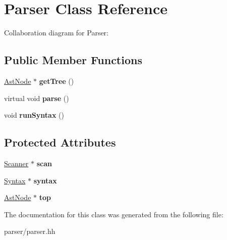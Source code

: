 \hypertarget{classParser}{}\section{Parser Class Reference}
\label{classParser}


Collaboration diagram for Parser\+:
\subsection*{Public Member Functions}
\begin{DoxyCompactItemize}
\item 
\mbox{\label{classParser_a2edc94ad5518bf2ab3d1fb4e6335ae29}} 
\hyperlink{classAstNode}{Ast\+Node} $\ast$ {\bfseries get\+Tree} ()
\item 
\mbox{\label{classParser_a92af82e4ed76f704cf313d977fd9da42}} 
virtual void {\bfseries parse} ()
\item 
\mbox{\label{classParser_a14052551613e73267b23f924034c06ce}} 
void {\bfseries run\+Syntax} ()
\end{DoxyCompactItemize}
\subsection*{Protected Attributes}
\begin{DoxyCompactItemize}
\item 
\mbox{\label{classParser_a7738e0093801e47b03769a71e8316a59}} 
\hyperlink{classScanner}{Scanner} $\ast$ {\bfseries scan}
\item 
\mbox{\label{classParser_aa5e80b0d9b6cffbea2abd7f9e3a0cf6e}} 
\hyperlink{classSyntax}{Syntax} $\ast$ {\bfseries syntax}
\item 
\mbox{\label{classParser_abbe2697a4122f792aa7c865ffdea811d}} 
\hyperlink{classAstNode}{Ast\+Node} $\ast$ {\bfseries top}
\end{DoxyCompactItemize}


The documentation for this class was generated from the following file\+:\begin{DoxyCompactItemize}
\item 
parser/parser.\+hh\end{DoxyCompactItemize}
